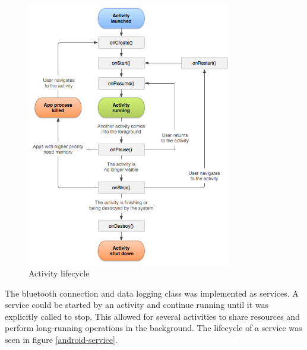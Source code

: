 \begin{figure}[H]
\centering
\includegraphics[width=0.8\textwidth]{Figures/activity_lifecycle.png}
\caption{Activity lifecycle}
\label{android-activity}
\end{figure}
The bluetooth connection and data logging class was implemented as services\cite{android-service}. A service could be started by an activity and continue running until it was explicitly called to stop. This allowed for several activities to share resources and perform long-running operations in the background. The lifecycle of a service was seen in figure \ref{android-service}.


